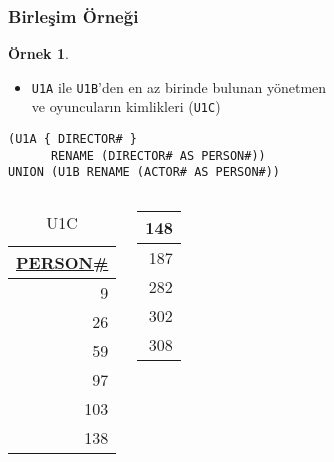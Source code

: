 \documentclass[dvipsnames]{beamer}
\theoremstyle{definition}
\theoremstyle{example}
\newtheorem{ornek}[theorem]{Örnek}
\theoremstyle{plain}
\begin{document}
\begin{frame}[fragile]
  \frametitle{Birleşim Örneği}

  \begin{ornek}
    \begin{itemize}
      \item \texttt{U1A} ile \texttt{U1B}'den en az birinde bulunan yönetmen\\
        ve oyuncuların kimlikleri (\texttt{U1C})
    \end{itemize}

    \begin{lstlisting}
(U1A { DIRECTOR# }
      RENAME (DIRECTOR# AS PERSON#))
UNION (U1B RENAME (ACTOR# AS PERSON#))
    \end{lstlisting}

    \pause
    \vspace{-10pt}
    \begin{columns}[b]
      \begin{tiny}
      \begin{table}
        \caption{U1C}
        \begin{tabular}{|r|}\hline
\underline{PERSON\#}\\[2pt]\hline\hline
                  9\\\hline
                 26\\\hline
                 59\\\hline
                 97\\\hline
                103\\\hline
                138\\\hline
        \end{tabular}
      \end{table}
      \end{tiny}

      \begin{tiny}
      \begin{table}
        \begin{tabular}{|r|}\hline
                148\\\hline
                187\\\hline
                282\\\hline
                302\\\hline
                308\\\hline
        \end{tabular}
      \end{table}
      \end{tiny}


\end{columns}
\end{ornek}
\end{frame}
\end{document}
